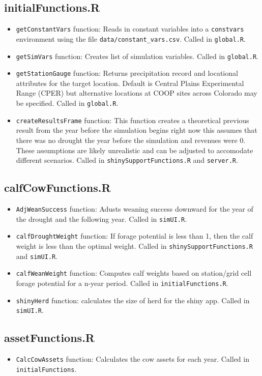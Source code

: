 \documentclass[11pt]{article}
\begin{document}
\subsection{initialFunctions.R}

\begin{itemize}
	\item \verb!getConstantVars! function: Reads in constant variables into a
  \verb!constvars! environment using the  file \verb!data/constant_vars.csv!. Called in \verb!global.R!.
  	\item \verb!getSimVars! function: Creates list of simulation variables. Called in \verb!global.R!.
  	\item \verb!getStationGauge! function: Returns precipitation record and locational attributes for the target location. Default is Central Plains Experimental Range (CPER) but alternative locations at COOP sites across Colorado may be specified. Called in \verb!global.R!.
  	\item \verb!createResultsFrame! function: This function creates a theoretical previous result from the year before the simulation begins right now this assumes that there was no drought the year before the simulation and revenues were 0. These assumptions are likely unrealistic and can be adjusted to accomodate different scenarios. Called in \verb!shinySupportFunctions.R! and \verb!server.R!.
\end{itemize}

\subsection{calfCowFunctions.R}

\begin{itemize}
	\item \verb!AdjWeanSuccess! function: Adusts weaning success downward for the year of the drought and the following year. Called in \verb!simUI.R!.
	\item \verb!calfDroughtWeight! function: If forage potential is less than 1, then the calf weight is less than the optimal weight. Called in \verb!shinySupportFunctions.R! and \verb!simUI.R!.
	\item \verb!calfWeanWeight! function: Computes calf weights based on station/grid cell forage potential for a n-year period. Called in \verb!initialFunctions.R!.
	\item \verb!shinyHerd! function: calculates the size of herd for the shiny app. Called in \verb!simUI.R!.
\end{itemize}

\subsection{assetFunctions.R}
\begin{itemize}
	\item \verb!CalcCowAssets! function: Calculates the cow assets for each year. Called in \verb!initialFunctions!.
\end{itemize}


 
\end{document}
